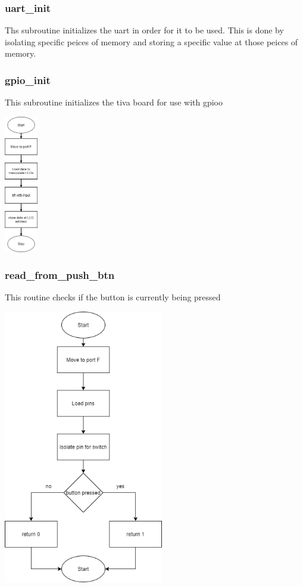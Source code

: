 \documentclass{article}
\begin{document}
    \subsubsection{uart\_init}
        Ths subroutine initializes the uart in order for it to be used. This is done by isolating specific
        peices of memory and storing a specific value at those peices of memory.

    \subsubsection{gpio\_init}
        This subroutine initializes the tiva board for use with gpioo
        \begin{center}
            {\includegraphics[height=6cm]{illuminate_RGB_LED.png}\centering} 
        \end{center}

    \newpage
    \subsubsection{read\_from\_push\_btn}
        This routine checks if the button is currently being pressed
        \begin{center}
            {\includegraphics[height=12cm]{read_from_push_btn.png}\centering} 
        \end{center}
\end{document}
